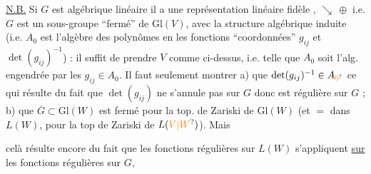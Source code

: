 \uline{N.B.}  Si $G$ est algébrique linéaire
il a une représentation linéaire fidèle 
, $\searrow\ \oplus$ 
i.e. $G$ est
un sous-groupe ``fermé'' de $\mathrm{Gl}(V)$, avec
la structure algébrique induite (i.e. $A_0$ est
l'algèbre des polynômes en les fonctions
``coordonnées'' $g_{ij}$ et $\det(g_{ij})^{-1}$) : il
suffit de prendre 
 $V$
comme ci-dessus, i.e. telle que $A_0$ soit
l'alg. engendrée par les  $g_{ij}\in A_0$.
Il faut seulement montrer a) que $\det(g_{ij})^{-1}\in A_{\unsure{0}}$
ce qui résulte du fait que $\det(g_{ij})$ ne
s'annule pas sur $G$ donc  
est  régulière sur $G$ ; b) que
$\overline G\subset\mathrm{Gl}(W)$ est fermé pour la top.
de Zariski de $\mathrm{Gl}(W)$ (et $=$ dans $L(W)$,
pour la top de Zariski de $L(\unsure{V|W})$). Mais

celà résulte encore du fait que les fonctions
régulières sur $L(W)$ s'appliquent \uline{sur} les fonctions
régulières sur $G$,


